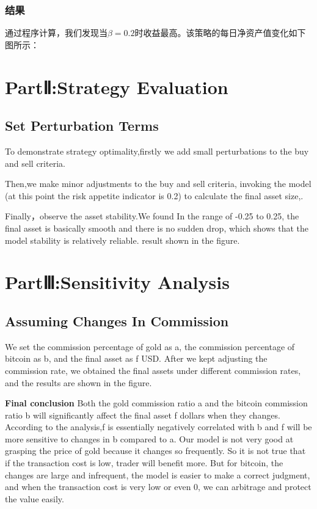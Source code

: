 \documentclass{mcmthesis}
\begin{document}
\subsubsection{结果}
通过程序计算，我们发现当$\beta=0.2$时收益最高。该策略的每日净资产值变化如下图所示：





\section{PartⅡ:Strategy Evaluation}
\subsection{Set Perturbation Terms }%
To demonstrate strategy optimality,firstly we add small perturbations to the buy and sell criteria.

Then,we make minor adjustments to the buy and sell criteria, invoking the model (at this point the risk appetite indicator is 0.2) to calculate the final asset size,.

Finally，observe the asset stability.We found In the range of -0.25 to 0.25, the final asset is basically smooth and there is no sudden drop, which shows that the model stability is relatively reliable.
result shown in the figure.

\section{PartⅢ:Sensitivity Analysis}
\subsection{Assuming Changes In Commission}
We set the commission percentage of gold as a, the commission percentage of bitcoin as b, and the final asset as f USD. 
After we kept adjusting the commission rate, we obtained the final assets under different commission rates, and the results are shown in the figure.%

\textbf{Final conclusion}
Both the gold commission ratio a and the bitcoin commission ratio b will significantly affect the final asset f dollars when they changes.
According to the analysis,f is essentially negatively correlated with b and f will be more sensitive to changes in b compared to a.
Our model is not very good at grasping the price of gold because it changes so frequently.
So it is not true that if the transaction cost is low, trader will benefit more.
But for bitcoin, the changes are large and infrequent, the model is easier to make a correct judgment, and when the transaction cost is very low or even 0, we can arbitrage and protect the value easily.
\end{document}
